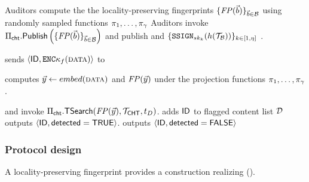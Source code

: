 \begin{algorithm}[t]
\caption{\protocolFM: content moderation with exact matching\label{protocol:fuzzy}}
\footnotesize
\begin{algorithmic}[1]



\For{$\blocklistVec \in \blocklist$}
\State Auditors compute the the locality-preserving fingerprints $\{\fingerprint(\blocklistVec)\}_{\blocklistVec \in \blocklist}$ using \numProjections randomly sampled functions $\projFn[1], \dots, \projFn[\numProjections]$
\EndFor
\State Auditors invoke $\chtACB.\publishList\left(\{ \fingerprint(\blocklistVec) \}_{\blocklistVec \in \blocklist}\right)$ and publish \chtBlklistToken and $\{\signGenSig[\auditorPrivKeyGenericScheme[\auditorIdx]](\hashFn(\blklistToken))\}_{\auditorIdx \in [1, \numAuditors]}$ . 

\Statex{}

\State \client sends $\langle \genericFileID, \encrypt{\fileKey}(\clientData) \rangle$ to \server

\State \client computes $\clientVec \assign \embed(\clientData)$ and $\fingerprint(\clientVec)$ under the projection functions $\projFn[1], \dots, \projFn[\numProjections]$. 

\State \client and \server invoke $\chtACB.\thresholdSearchBlocklist(\fingerprint(\clientVec), \chtBlklistToken, \detectionThreshold)$. 
\State \server adds $\mathsf{ID}$ to flagged content list $\mathcal{D}$
\State \server outputs $\langle \mathsf{ID}, \mathsf{detected}=\mathsf{TRUE}\rangle$. 
\Else 
\State \server outputs $\langle \mathsf{ID}, \mathsf{detected}=\mathsf{FALSE}\rangle$
\EndIf


\end{algorithmic}
\end{algorithm}





\subsubsection{Protocol design}
%
A locality-preserving fingerprint provides a construction realizing \contentModFuncFuzzy (). 

